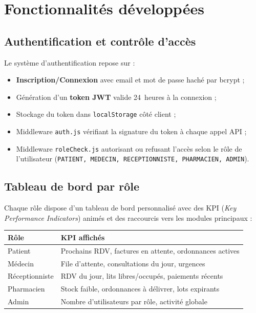 \documentclass[12pt, a4paper]{report}
\begin{document}
\chapter{Fonctionnalités développées}

\section{Authentification et contrôle d'accès}

Le système d'authentification repose sur :
\begin{itemize}
  \item \textbf{Inscription/Connexion} avec email et mot de passe haché par bcrypt ;
  \item Génération d'un \textbf{token JWT} valide 24~heures à la connexion ;
  \item Stockage du token dans \texttt{localStorage} côté client ;
  \item Middleware \texttt{auth.js} vérifiant la signature du token à chaque
        appel API ;
  \item Middleware \texttt{roleCheck.js} autorisant ou refusant l'accès selon
        le rôle de l'utilisateur (\texttt{PATIENT, MEDECIN, RECEPTIONNISTE,
        PHARMACIEN, ADMIN}).
\end{itemize}

\section{Tableau de bord par rôle}

Chaque rôle dispose d'un tableau de bord personnalisé avec des KPI
(\textit{Key Performance Indicators}) animés et des raccourcis vers les modules
principaux :

\begin{center}
\begin{tabular}{ll}
  \toprule
  \textbf{Rôle} & \textbf{KPI affichés} \\
  \midrule
  Patient        & Prochains RDV, factures en attente, ordonnances actives \\
  Médecin        & File d'attente, consultations du jour, urgences \\
  Réceptionniste & RDV du jour, lits libres/occupés, paiements récents \\
  Pharmacien     & Stock faible, ordonnances à délivrer, lots expirants \\
  Admin          & Nombre d'utilisateurs par rôle, activité globale \\
  \bottomrule
\end{tabular}
\end{center}
\end{document}
